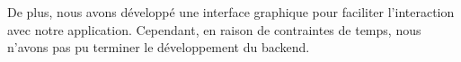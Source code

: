 \documentclass{report}
\begin{document}
De plus, nous avons développé une interface graphique pour faciliter l'interaction avec notre application. Cependant, en raison de contraintes de temps, nous n'avons pas pu terminer le développement du backend. 




\vspace{2cm}



\end{document}
